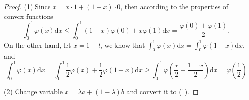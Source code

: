 \begin{proof}
  (1) Since $x = x \cdot 1 + (1 - x) \cdot 0$, then according to the properties
  of convex functions
  \begin{equation}
    \int_0^1 \varphi(x)\mathrm{d} x \leq
    \int_0^1 (1-x)\varphi(0) + x\varphi(1)\mathrm{d} x = 
    \frac{\varphi(0) + \varphi(1)}{2}.
  \end{equation}
  On the other hand, let $x = 1 - t$,
  we know that $\int_0^1 \varphi(x)\mathrm{d} x = \int_0^1
  \varphi(1-x)\mathrm{d} x$, and
  \begin{equation}
    \int_0^1\varphi(x)\mathrm{d}x=\int_0^1\frac{1}{2}\varphi(x)+\frac{1}{2}\varphi(1-x)\mathrm{d}x\geq\int_0^1\varphi\left(\frac{x}{2}+\frac{1-x}{2}\right)\mathrm{d}x=\varphi\left(\frac{1}{2}\right)
  \end{equation}

  (2) Change variable $x = \lambda a + (1-\lambda)b$ and convert it to (1).
\end{proof}


